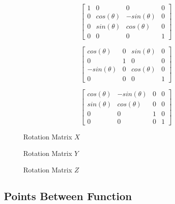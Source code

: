 \documentclass[14pt]{article}
\begin{document}
\begin{figure}[h]
	\begin{center}
		\begin{minipage}[b]{0.3\textwidth}
			\centering
			
			$$
			\begin{bmatrix}
			1 & 0 & 0 & 0\\
			0 & cos(\theta) & -sin(\theta) & 0\\ 
			0 & sin(\theta) & cos(\theta) & 0\\
			0 & 0 & 0 & 1
			\end{bmatrix}
			$$
		\end{minipage}
		\hfill
		\begin{minipage}[b]{0.3\textwidth}
			\centering
			$$
			\begin{bmatrix}
			cos(\theta) & 0 & sin(\theta)& 0 \\
			0 & 1 & 0 & 0 \\
			-sin(\theta) & 0 & cos(\theta) & 0 \\
			0 & 0 & 0 & 1
			\end{bmatrix}			
			$$
		\end{minipage}
		\hfill
		\begin{minipage}[b]{0.3\textwidth}
			\centering
			$$
			\begin{bmatrix}
			cos(\theta) & -sin(\theta) & 0 & 0 \\
			sin(\theta) & cos(\theta) & 0 & 0\\
			0 & 0 & 1 & 0 \\
			0 & 0 & 0 & 1
			\end{bmatrix}			
			$$
		\end{minipage}
	\end{center}
	\begin{center}
		\begin{minipage}[t]{0.3\textwidth}
			\caption*{Rotation Matrix $X$}
		\end{minipage}
		\hfill
		\begin{minipage}[t]{0.3\textwidth}
			\caption*{Rotation Matrix $Y$}
		\end{minipage}
		\hfill
		\begin{minipage}[t]{0.3\textwidth}
			\caption*{Rotation Matrix $Z$}
		\end{minipage}
	\end{center}
\end{figure}

\vspace{-7mm}

\subsection*{Points Between Function}
\end{document}
